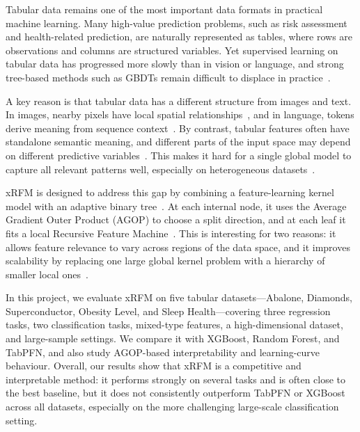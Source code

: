 Tabular data remains one of the most important data formats in practical machine learning. Many high-value prediction problems, such as risk assessment and health-related prediction, are naturally represented as tables, where rows are observations and columns are structured variables. Yet supervised learning on tabular data has progressed more slowly than in vision or language, and strong tree-based methods such as GBDTs remain difficult to displace in practice~\cite{ref1}.

A key reason is that tabular data has a different structure from images and text. In images, nearby pixels have local spatial relationships~\cite{ref2}, and in language, tokens derive meaning from sequence context~\cite{ref3}. By contrast, tabular features often have standalone semantic meaning, and different parts of the input space may depend on different predictive variables~\cite{ref1}. This makes it hard for a single global model to capture all relevant patterns well, especially on heterogeneous datasets~\cite{ref1}.

xRFM is designed to address this gap by combining a feature-learning kernel model with an adaptive binary tree~\cite{ref1}. At each internal node, it uses the Average Gradient Outer Product (AGOP) to choose a split direction, and at each leaf it fits a local Recursive Feature Machine~\cite{ref1,ref4}. This is interesting for two reasons: it allows feature relevance to vary across regions of the data space, and it improves scalability by replacing one large global kernel problem with a hierarchy of smaller local ones~\cite{ref1}.

In this project, we evaluate xRFM on five tabular datasets---Abalone, Diamonds, Superconductor, Obesity Level, and Sleep Health---covering three regression tasks, two classification tasks, mixed-type features, a high-dimensional dataset, and large-sample settings. We compare it with XGBoost, Random Forest, and TabPFN, and also study AGOP-based interpretability and learning-curve behaviour. Overall, our results show that xRFM is a competitive and interpretable method: it performs strongly on several tasks and is often close to the best baseline, but it does not consistently outperform TabPFN or XGBoost across all datasets, especially on the more challenging large-scale classification setting.